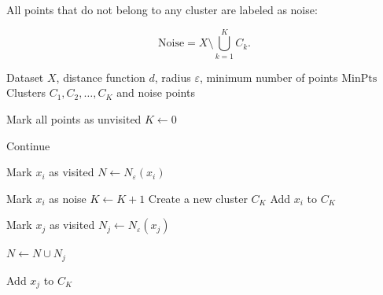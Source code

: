 \documentclass[a4paper]{article}
\begin{document}
      All points that do not belong to any cluster are labeled as noise:

      \[
      \mathrm{Noise}
      =
      X \setminus \bigcup_{k=1}^{K} C_k.
      \]

      \begin{algorithm}
         \caption{DBSCAN}
         \begin{algorithmic}[1]
            \Require Dataset \(X\), distance function \(d\), radius \(\varepsilon\), minimum number of points \(\mathrm{MinPts}\)
            \Ensure Clusters \(C_1, C_2, \dots, C_K\) and noise points

            \State Mark all points as unvisited
            \State \(K \gets 0\)

            \State Continue
            \EndIf

            \State Mark \(x_i\) as visited
            \State \(N \gets N_{\varepsilon}(x_i)\)

            \State Mark \(x_i\) as noise
            \Else
            \State \(K \gets K + 1\)
            \State Create a new cluster \(C_K\)
            \State Add \(x_i\) to \(C_K\)

            \State Mark \(x_j\) as visited
            \State \(N_j \gets N_{\varepsilon}(x_j)\)

            \State \(N \gets N \cup N_j\)
            \EndIf
            \EndIf

            \State Add \(x_j\) to \(C_K\)
            \EndIf
            \EndFor
            \EndIf
            \EndFor
         \end{algorithmic}
      \end{algorithm}
      \nocite{*}
      
      
\end{document}
